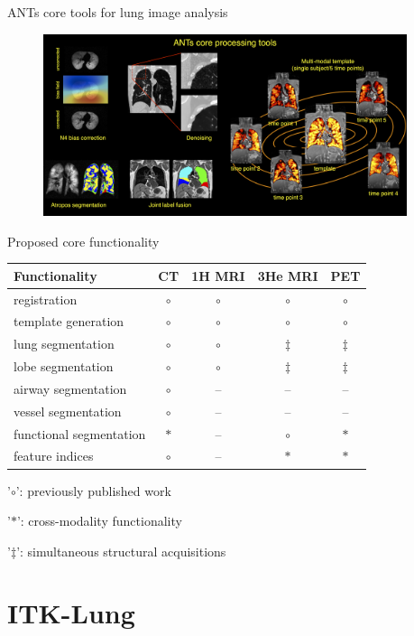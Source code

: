 \documentclass[ignorenonframetext,]{beamer}
\begin{document}
\begin{frame}{ANTs core tools for lung image analysis}

\centering

\begin{figure}
\includegraphics[width=0.95\textwidth]{./lung/figures/coreANtsToolsLung.png}
\end{figure}

\end{frame}

\begin{frame}{Proposed core functionality}

\begin{longtable}[c]{@{}lcccc@{}}
\toprule
\textbf{Functionality} & \textbf{CT} & \textbf{1H MRI} & \textbf{3He
MRI} & \textbf{PET}\tabularnewline
\midrule
\endhead
registration & \(\circ\) & \(\circ\) & \(\circ\) &
\(\circ\)\tabularnewline
template generation & \(\circ\) & \(\circ\) & \(\circ\) &
\(\circ\)\tabularnewline
lung segmentation & \(\circ\) & \(\circ\) & \(\ddagger\) &
\(\ddagger\)\tabularnewline
lobe segmentation & \(\circ\) & \(\circ\) & \(\ddagger\) &
\(\ddagger\)\tabularnewline
airway segmentation & \(\circ\) & -- & -- & --\tabularnewline
vessel segmentation & \(\circ\) & -- & -- & --\tabularnewline
functional segmentation & \(\ast\) & -- & \(\circ\) &
\(\ast\)\tabularnewline
feature indices & \(\circ\) & -- & \(\ast\) & \(\ast\)\tabularnewline
\bottomrule
\end{longtable}

\footnotesize

'\(\circ\)': previously published work

'\(\ast\)': cross-modality functionality

'\(\ddagger\)': simultaneous structural acquisitions

\end{frame}

\section{ITK-Lung}\label{itk-lung-1}
\end{document}
